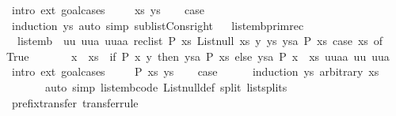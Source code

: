 \begin{isabellebody}
%
\isadelimproof
%
\endisadelimproof
%
\isatagproof
{}\isamarkupfalse%
\ {\isacharparenleft}intro\ ext{\isacharcomma}\ goal{\isacharunderscore}cases{\isacharparenright}\isanewline
\ \ \isamarkupfalse%
\ {\isacharparenleft}{}\ xs\ ys{\isacharparenright}\isanewline
\ \ \isamarkupfalse%
\ {\isacharquery}case\ \isamarkupfalse%
\ {\isacharparenleft}induction\ ys{\isacharparenright}\ {\isacharparenleft}auto\ simp{\isacharcolon}\ sublist{\isacharunderscore}Cons{\isacharunderscore}right{\isacharparenright}\isanewline
{}\isamarkupfalse%
\isanewline
\isanewline
{}%
\endisatagproof
{\isafoldproof}%
%
\isadelimproof
%
\endisadelimproof
\ \isamarkupfalse%
\ list{\isacharunderscore}emb{\isacharunderscore}primrec{\isacharcolon}\isanewline
\ \ {\isachardoublequoteopen}list{\isacharunderscore}emb\ {\isacharequal}\ {\isacharparenleft}{\isasymlambda}uu\ uua\ uuaa{\isachardot}\ rec{\isacharunderscore}list\ {\isacharparenleft}{\isasymlambda}P\ xs{\isachardot}\ List{\isachardot}null\ xs{\isacharparenright}\ {\isacharparenleft}{\isasymlambda}y\ ys\ ysa\ P\ xs{\isachardot}\ case\ xs\ of\ {\isacharbrackleft}{\isacharbrackright}\ {\isasymRightarrow}\ True\ \isanewline
\ \ \ \ \ {\isacharbar}\ x\ {\isacharhash}\ xs\ {\isasymRightarrow}\ if\ P\ x\ y\ then\ ysa\ P\ xs\ else\ ysa\ P\ {\isacharparenleft}x\ {\isacharhash}\ xs{\isacharparenright}{\isacharparenright}\ uuaa\ uu\ uua{\isacharparenright}{\isachardoublequoteclose}\isanewline
%
\isadelimproof
%
\endisadelimproof
%
\isatagproof
{}\isamarkupfalse%
\ {\isacharparenleft}intro\ ext{\isacharcomma}\ goal{\isacharunderscore}cases{\isacharparenright}\isanewline
\ \ \isamarkupfalse%
\ {\isacharparenleft}{}\ P\ xs\ ys{\isacharparenright}\isanewline
\ \ \isamarkupfalse%
\ {\isacharquery}case\isanewline
\ \ \ \ \isamarkupfalse%
\ {\isacharparenleft}induction\ ys\ arbitrary{\isacharcolon}\ xs{\isacharparenright}\isanewline
\ \ \ \ \ \ \ {\isacharparenleft}auto\ simp{\isacharcolon}\ list{\isacharunderscore}emb{\isacharunderscore}code\ List{\isachardot}null{\isacharunderscore}def\ split{\isacharcolon}\ list{\isachardot}splits{\isacharparenright}\isanewline
{}\isamarkupfalse%
%
\endisatagproof
{\isafoldproof}%
%
\isadelimproof
\isanewline
%
\endisadelimproof
\isanewline
{}\isamarkupfalse%
\ prefix{\isacharunderscore}transfer\ {\isacharbrackleft}transfer{\isacharunderscore}rule{\isacharbrackright}{\isacharcolon}\isanewline

\end{isabellebody}
